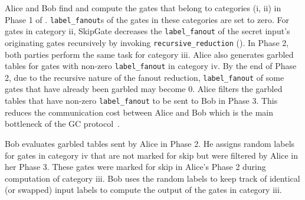 Alice and Bob find and compute the gates that belong to categories (i, ii) in Phase 1 of .
\texttt{label\_fanout}s of the gates in these categories are set to zero.
For gates in category ii, SkipGate decreases the \texttt{label\_fanout} of the secret input's originating gates recursively by invoking \texttt{recursive\_reduction} ().
In Phase 2, both parties perform the same task for category iii.
Alice also generates garbled tables for gates with non-zero \texttt{label\_fanout} in category iv.
By the end of Phase 2, due to the recursive nature of the fanout reduction, \texttt{label\_fanout} of some gates that have already been garbled may become 0.
Alice filters the garbled tables that have non-zero \texttt{label\_fanout} to be sent to Bob in Phase 3.
This reduces the communication cost between Alice and Bob which is the main bottleneck of the GC protocol~\cite{gueron2015fast}.

Bob evaluates garbled tables sent by Alice in Phase 2.
He assigns random labels for gates in category iv that are not marked for skip but were filtered by Alice in her Phase 3.
These gates were marked for skip in Alice's Phase 2 during computation of category iii.
Bob uses the random labels to keep track of identical (or swapped) input labels to compute the output of the gates in category iii.

